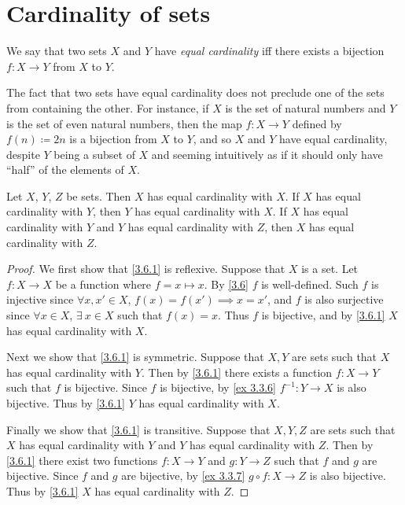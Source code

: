 \section{Cardinality of sets}\label{sec 3.6}

\begin{definition}\label{3.6.1}
  We say that two sets \(X\) and \(Y\) have \emph{equal cardinality} iff there exists a bijection \(f : X \to Y\) from \(X\) to \(Y\).
\end{definition}

\setcounter{theorem}{2}
\begin{remark}\label{3.6.3}
  The fact that two sets have equal cardinality does not preclude one of the sets from containing the other.
  For instance, if \(X\) is the set of natural numbers and \(Y\) is the set of even natural numbers, then the map \(f : X \to Y\) defined by \(f(n) \coloneqq 2n\) is a bijection from \(X\) to \(Y\), and so \(X\) and \(Y\) have equal cardinality, despite \(Y\) being a subset of \(X\) and seeming intuitively as if it should only have ``half'' of the elements of \(X\).
\end{remark}

\begin{proposition}\label{3.6.4}
  Let \(X\), \(Y\), \(Z\) be sets.
  Then \(X\) has equal cardinality with \(X\).
  If \(X\) has equal cardinality with \(Y\), then \(Y\) has equal cardinality with \(X\).
  If \(X\) has equal cardinality with \(Y\) and \(Y\) has equal cardinality with \(Z\), then \(X\) has equal cardinality with \(Z\).
\end{proposition}

\begin{proof}
  We first show that \cref{3.6.1} is reflexive.
  Suppose that \(X\) is a set.
  Let \(f : X \to X\) be a function where \(f = x \mapsto x\).
  By \cref{3.6} \(f\) is well-defined.
  Such \(f\) is injective since \(\forall x, x' \in X\), \(f(x) = f(x') \implies x = x'\), and \(f\) is also surjective since \(\forall x \in X\), \(\exists\ x \in X\) such that \(f(x) = x\).
  Thus \(f\) is bijective, and by \cref{3.6.1} \(X\) has equal cardinality with \(X\).

  Next we show that \cref{3.6.1} is symmetric.
  Suppose that \(X, Y\) are sets such that \(X\) has equal cardinality with \(Y\).
  Then by \cref{3.6.1} there exists a function \(f : X \to Y\) such that \(f\) is bijective.
  Since \(f\) is bijective, by \cref{ex 3.3.6} \(f^{-1} : Y \to X\) is also bijective.
  Thus by \cref{3.6.1} \(Y\) has equal cardinality with \(X\).

  Finally we show that \cref{3.6.1} is transitive.
  Suppose that \(X, Y, Z\) are sets such that \(X\) has equal cardinality with \(Y\) and \(Y\) has equal cardinality with \(Z\).
  Then by \cref{3.6.1} there exist two functions \(f : X \to Y\) and \(g : Y \to Z\) such that \(f\) and \(g\) are bijective.
  Since \(f\) and \(g\) are bijective, by \cref{ex 3.3.7} \(g \circ f : X \to Z\) is also bijective.
  Thus by \cref{3.6.1} \(X\) has equal cardinality with \(Z\).
\end{proof}


